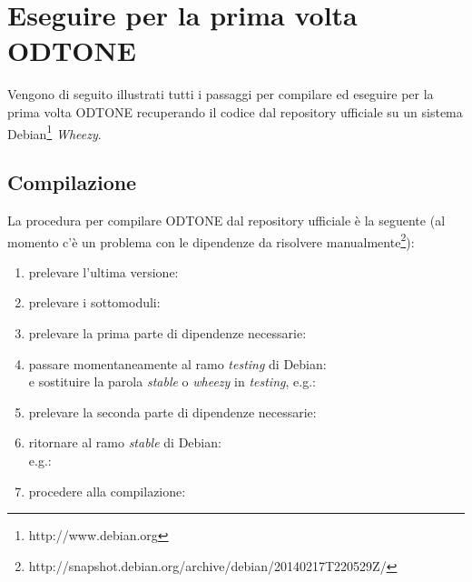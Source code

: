 \section{Eseguire per la prima volta ODTONE}
Vengono di seguito illustrati tutti i passaggi per compilare ed eseguire per la prima volta ODTONE recuperando il codice dal repository ufficiale su un sistema Debian\footnote{http://www.debian.org} {\em Wheezy}.

\subsection{Compilazione}
La procedura per compilare ODTONE dal repository ufficiale è la seguente (al momento c'è un problema con le dipendenze da risolvere manualmente\footnote{http://snapshot.debian.org/archive/debian/20140217T220529Z/}):
\begin{enumerate}
\item prelevare l'ultima versione:\\

\item prelevare i sottomoduli:\\

\item prelevare la prima parte di dipendenze necessarie:\\

\item passare momentaneamente al ramo {\em testing} di Debian:\\
e sostituire la parola {\em stable} o {\em wheezy} in {\em testing}, e.g.:\\

\item prelevare la seconda parte di dipendenze necessarie:\\

\item ritornare al ramo {\em stable} di Debian:\\
e.g.:\\

\item procedere alla compilazione:\\

\end{enumerate}

